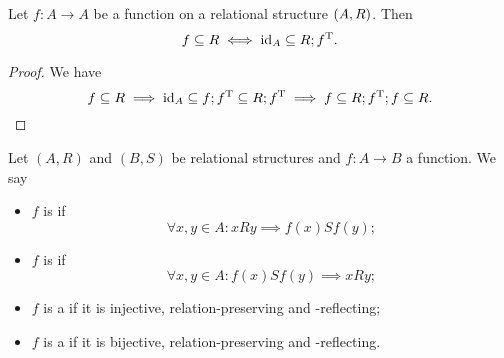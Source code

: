 \begin{lemma} \label{functionSubsetRelation}
Let $f: A\to A$ be a function on a relational structure $\sSet{A,R}$. Then
\[ f \subseteq R \iff \operatorname{id}_A \subseteq R;f^{\mathrm{T}}. \]
\end{lemma}
\begin{proof}
We have
\[ f \subseteq R \implies \operatorname{id}_A \subseteq f;f^{\mathrm{T}} \subseteq R;f^{\mathrm{T}} \implies f \subseteq R;f^{\mathrm{T}};f \subseteq R. \]
\end{proof}

\begin{definition}
Let $(A, R)$ and $(B, S)$ be relational structures and $f: A\to B$ a function. We say
\begin{itemize}
\item $f$ is  if
\[ \forall x,y\in A: xRy \implies f(x)Sf(y); \]
\item $f$ is  if
\[ \forall x,y\in A: f(x)Sf(y) \implies xRy; \]
\item $f$ is a  if it is injective, relation-preserving and -reflecting;
\item $f$ is a  if it is bijective, relation-preserving and -reflecting.
\end{itemize}
\end{definition}

